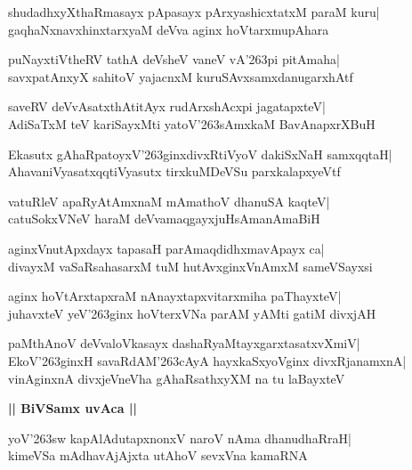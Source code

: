 \documentclass[twoside,12pt,openright]{book}
\def\S{\char'263}
\newcounter{shloka}[chapter]
\def\uvaca#1{\centerline{{\large\textbf{#1}}}}
\begin{document}
\begin{shloka}%
shudadhxyXthaRmasayx pApasayx pArxyashicxtatxM paraM kuru|\\
gaqhaNxnavxhinxtarxyaM deVva aginx hoVtarxmupAhara
\end{shloka}

\begin{shloka}%
puNayxtiVtheRV tathA deVsheV vaneV vA\S pi pitAmaha|\\
savxpatAnxyX sahitoV yajacnxM kuruSAvxsamxdanugarxhAtf
\end{shloka}

\begin{shloka}%
saveRV deVvAsatxthAtitAyx rudArxshAcxpi jagatapxteV|\\
AdiSaTxM teV kariSayxMti yatoV\S sAmxkaM BavAnapxrXBuH
\end{shloka}

\begin{shloka}%
Ekasutx gAhaRpatoyxV\S ginxdivxRtiVyoV dakiSxNaH samxqqtaH|\\
AhavaniVyasatxqqtiVyasutx tirxkuMDeVSu parxkalapxyeVtf
\end{shloka}

\begin{shloka}%
vatuRleV apaRyAtAmxnaM mAmathoV dhanuSA kaqteV|\\
catuSokxVNeV haraM deVvamaqgayxjuHsAmanAmaBiH
\end{shloka}

\begin{shloka}%
aginxVnutApxdayx tapasaH parAmaqdidhxmavApayx ca|\\
divayxM vaSaRsahasarxM tuM hutAvxginxVnAmxM sameVSayxsi
\end{shloka}

\begin{shloka}%
aginx hoVtArxtapxraM nAnayxtapxvitarxmiha paThayxteV|\\
juhavxteV yeV\S ginx hoVterxVNa parAM yAMti gatiM divxjAH
\end{shloka}

\begin{shloka}%
paMthAnoV deVvaloVkasayx dashaRyaMtayxgarxtasatxvXmiV|\\
EkoV\S ginxH savaRdAM\S cAyA hayxkaSxyoVginx divxRjanamxnA|\\
vinAginxnA divxjeVneVha gAhaRsathxyXM na tu laBayxteV
\end{shloka}

\uvaca{|| BiVSamx uvAca ||}
\begin{shloka}%
yoV\S sw kapAlAdutapxnonxV naroV nAma dhanudhaRraH|\\
kimeVSa mAdhavAjAjxta utAhoV sevxVna kamaRNA
\end{shloka}
\end{document}
